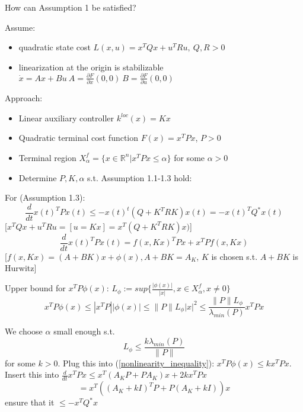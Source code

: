 How can Assumption 1 be satisfied?

Assume:
\begin{itemize}
\item quadratic state cost $L(x,u) = x^TQx + u^TRu, \ Q,R >0$
\item linearization at the origin is stabilizable 
$\dot x = Ax+Bu \ A = \frac{\partial F}{\partial x}(0,0) \ B = \frac{\partial F}{\partial u}(0,0)$
\end{itemize} 

Approach: 
\begin{itemize}
\item Linear auxiliary controller $k^{loc}(x)=Kx$
\item Quadratic terminal cost function $F(x) = x^TPx$, $P > 0$
\item Terminal region $X_{\alpha}^f = \{x \in \mathbb{R}^n | x^TPx \leq \alpha\}$ for some $\alpha > 0$
\item Determine $P,K,\alpha$ s.t. Assumption 1.1-1.3 hold:
\end{itemize}
For (Assumption 1.3):
\begin{equation*}
\frac{d}{dt}x(t)^TPx(t) \leq - x(t)^t(Q + K^TRK)x(t) = - x(t)^TQ^*x(t)
\end{equation*}
[$x^TQx + u^TRu = [u=Kx] = x^T(Q+K^TRK)x)$]
\begin{equation*}
\frac{d}{dt}x(t)^TPx(t) = f(x,Kx)^TPx + x^TPf(x,Kx)
\end{equation*}
[$f(x,Kx) = (A+BK)x+\phi(x), A+BK = A_K$, $K$ is chosen s.t. $A+BK$ is Hurwitz]

Upper bound for $x^TP\phi(x)$:
$L_{\phi} := sup\{ \frac{|\phi(x)|}{|x|}, x \in X_{\alpha}^{f}, x \neq 0\}$
\begin{equation}\label{nonlinearity_inequality}
x^TP\phi(x) \leq |x^TP| |\phi(x)| \leq \| P\| L_{\phi} |x|^2 \leq \frac{\|P\|L_{\phi}}{\lambda_{min}(P)}x^TPx
\end{equation}

We choose $\alpha$ small enough s.t. 
\begin{equation}\label{alpha_choice}
L_{\phi} \leq \frac{k \lambda_{min}(P)}{\|P\|} 
\end{equation}
for some $k > 0$. Plug this into (\ref{nonlinearity_inequality}): $x^TP\phi(x) \leq kx^TPx$. 
Insert this into $\frac{d}{dt}x^TPx \leq x^T(A_KP + PA_K)x + 2kx^TPx$
\begin{equation*}
= x^T((A_K + kI)^TP + P(A_K+kI))x
\end{equation*}
ensure that it $\leq - x^TQ^*x$

